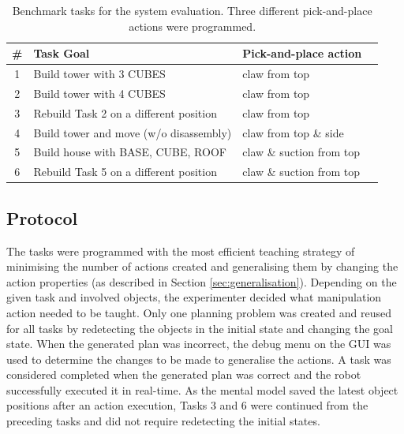 \begin{table}[h]
	\begin{center}
		\caption{Benchmark tasks for the system evaluation. Three different pick-and-place actions were programmed.}
		\label{table:task-list}
		\begin{tabular}{clll}
			\# & Task Goal & Pick-and-place action\\ \hline
			1 & Build tower with 3 CUBES & claw from top \\
			2 & Build tower with 4 CUBES & claw from top \\
			3 & Rebuild Task 2 on a different position & claw from top \\
			4 & Build tower and move (w/o disassembly) & claw from top \& side \\
			5 & Build house with BASE, CUBE, ROOF & claw \& suction from top \\
			6 & Rebuild Task 5 on a different position & claw \& suction from top \\
		\end{tabular}
	\end{center}
\end{table}

\subsection{Protocol}
The tasks were programmed with the most efficient teaching strategy of minimising the number of actions created and generalising them by changing the action properties (as described in Section \ref{sec:generalisation}).
Depending on the given task and involved objects, the experimenter decided what manipulation action needed to be taught.
Only one planning problem was created and reused for all tasks by redetecting the objects in the initial state and changing the goal state.
When the generated plan was incorrect, the debug menu on the GUI was used to determine the changes to be made to generalise the actions.
A task was considered completed when the generated plan was correct and the robot successfully executed it in real-time.
As the mental model saved the latest object positions after an action execution, Tasks 3 and 6 were continued from the preceding tasks and did not require redetecting the initial states. 


